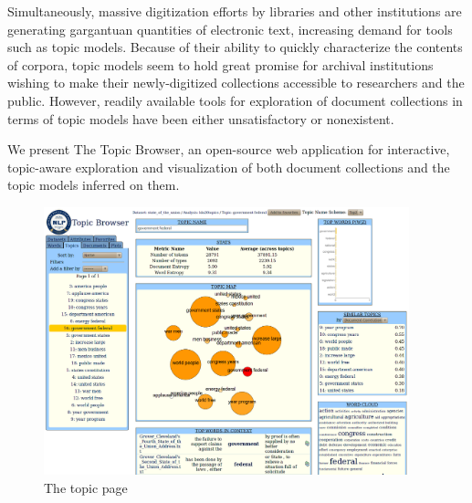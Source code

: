 \documentclass[11pt]{article}
\begin{document}
Simultaneously, massive digitization efforts by libraries and other institutions
are generating gargantuan quantities of electronic text, increasing demand for tools such as
topic models. Because of their ability to quickly characterize the contents of
corpora, topic models seem to hold great promise for archival
institutions wishing to make their newly-digitized collections accessible to
researchers and the public. However, readily available tools for exploration of 
document collections in terms of topic models have been either unsatisfactory
or nonexistent.

We present The Topic Browser, an open-source web application for interactive,
topic-aware exploration and visualization of both document collections and the
topic models inferred on them.
\begin{figure}[ht]
 \centering
 \includegraphics[width=400px,keepaspectratio=true]{./topic_page_take2.png}
 \caption{The topic page}
 \label{fig:topic_page}
\end{figure}
\end{document}
